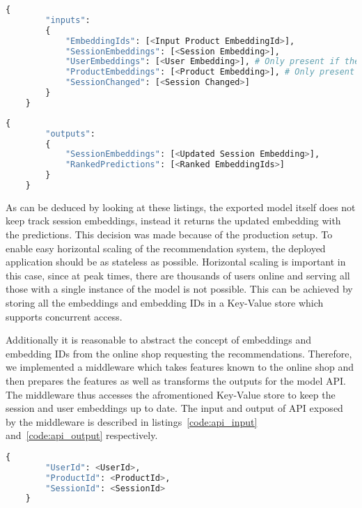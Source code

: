 \begin{minipage}{\linewidth}
    \begin{lstlisting}[language=Python,frame=single,caption=TF Serve API Input,label=code:tf_serve_input]
    {
        "inputs": 
        {
            "EmbeddingIds": [<Input Product EmbeddingId>],
            "SessionEmbeddings": [<Session Embedding>],
            "UserEmbeddings": [<User Embedding>], # Only present if the user layer is used
            "ProductEmbeddings": [<Product Embedding>], # Only present if product embeddings are used
            "SessionChanged": [<Session Changed>]
        }
    }
    \end{lstlisting}
\end{minipage}
\begin{minipage}{\linewidth}
    \begin{lstlisting}[language=Python,frame=single,caption=TF Serve API Output,label=code:tf_serve_output]
    {
        "outputs": 
        {
            "SessionEmbeddings": [<Updated Session Embedding>],
            "RankedPredictions": [<Ranked EmbeddingIds>]
        }
    }
    \end{lstlisting}
\end{minipage}
As can be deduced by looking at these listings, the exported model itself does not keep track session embeddings, instead it returns the updated embedding with the predictions.
This decision was made because of the production setup.
To enable easy horizontal scaling of the recommendation system, the deployed application should be as stateless as possible.
Horizontal scaling is important in this case, since at peak times, there are thousands of users online and serving all those with a single instance of the model is not possible.
This can be achieved by storing all the embeddings and embedding IDs in a Key-Value store which supports concurrent access.
\par
Additionally it is reasonable to abstract the concept of embeddings and embedding IDs from the online shop requesting the recommendations.
Therefore, we implemented a middleware which takes features known to the online shop and then prepares the features as well as transforms the outputs for the model API.
The middleware thus accesses the afromentioned Key-Value store to keep the session and user embeddings up to date.
The input and output of API exposed by the middleware is described in listings~\ref{code:api_input} and~\ref{code:api_output} respectively.

\begin{minipage}{\linewidth}
    \begin{lstlisting}[language=Python,frame=single,caption=Middleware API Input,label=code:api_input]
    {
        "UserId": <UserId>,
        "ProductId": <ProductId>,
        "SessionId": <SessionId>
    }
    \end{lstlisting}
\end{minipage}

